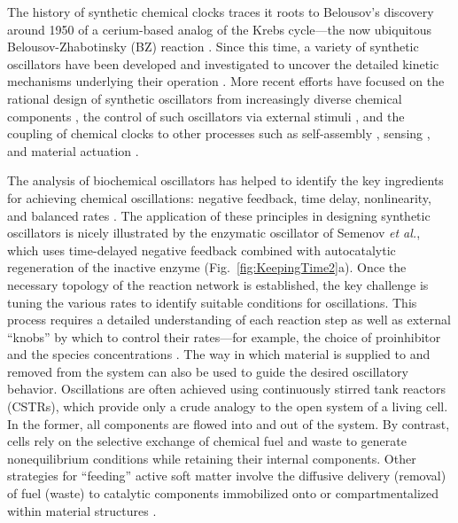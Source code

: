 \begin{appendices}
The history of synthetic chemical clocks traces it roots to Belousov's discovery around 1950 of a cerium-based analog of the Krebs cycle---the now ubiquitous Belousov-Zhabotinsky (BZ) reaction \cite{winfree1984prehistory}. Since this time, a variety of synthetic oscillators have been developed and investigated to uncover the detailed kinetic mechanisms underlying their operation \cite{epstein1998introduction}. More recent efforts have focused on the rational design of synthetic oscillators from increasingly diverse chemical components \cite{DeKepper1981, Kurin-Csorgel2005, semenov2015rational, Semenov2016}, the control of such oscillators via external stimuli \cite{Petrov1997, pogodaev2017photochemical}, and the coupling of chemical clocks to other processes such as self-assembly \cite{Lagzi2010,tagliazucchi2014dissipative}, sensing \cite{Epstein2012}, and material actuation \cite{Yashin2012, Yoshida2014, Tamate2016}.  

The analysis of biochemical oscillators has helped to identify the key ingredients for achieving chemical oscillations: negative feedback, time delay, nonlinearity, and balanced rates \cite{Novak2008}.  The application of these principles in designing synthetic oscillators is nicely illustrated by the enzymatic oscillator of Semenov \emph{et al.}, which uses time-delayed negative feedback combined with autocatalytic regeneration of the inactive enzyme \cite{semenov2015rational} (Fig.~\ref{fig:KeepingTime2}a). Once the necessary topology of the reaction network is established, the key challenge is tuning the various rates to identify suitable conditions for oscillations. This process requires a detailed understanding of each reaction step as well as external ``knobs'' by which to control their rates---for example, the choice of proinhibitor and the species concentrations \cite{semenov2015rational}.  The way in which material is supplied to and removed from the system can also be used to guide the desired oscillatory behavior. Oscillations are often achieved using continuously stirred tank reactors (CSTRs), which provide only a crude analogy to the open system of a living cell. In the former, all components are flowed into and out of the system. By contrast, cells rely on the selective exchange of chemical fuel and waste to generate nonequilibrium conditions while retaining their internal components.  Other strategies for ``feeding'' active soft matter involve the diffusive delivery (removal) of fuel (waste) to catalytic components immobilized onto or compartmentalized within material structures \cite{zhang2014giant, Tamate2016}.


\end{appendices}
